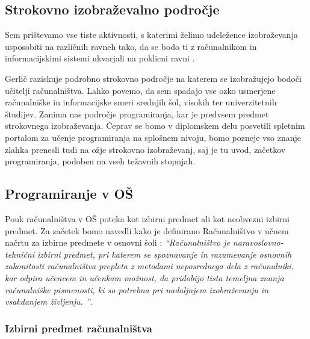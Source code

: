 
\subsection{Strokovno izobraževalno področje}
\label{sec:strokovno_izo_področje}


Sem prištevamo vse tiste aktivnosti, s katerimi želimo udeležence
izobraževanja usposobiti na različnih ravneh tako, da se bodo ti z
računalnikom in informacijskimi sistemi ukvarjali na poklicni ravni
\cite{gerlic_2000}.

Gerlič raziskuje podrobno strokovno področje na katerem se
izobražujejo bodoči učitelji računalništva. Lahko povemo, da sem
spadajo vse ozko usmerjene računalniške in informacijske smeri srednjih
šol, visokih ter univerzitetnih študijev. Zanima nas področje
programiranja, kar je predvsem predmet strokovnega
izobraževanja. Čeprav se bomo v diplomskem delu posvetili spletnim
portalom za učenje programiranja na splošnem nivoju, bomo pozneje vso
znanje zlahka prenesli tudi na ožje strokovno izobraževanj, saj je tu
uvod, začetkov programiranja, podoben na vseh težavnih stopnjah.

\subsection{Programiranje v OŠ}
\label{sec:Programiranje_v_OŠ}

Pouk računalništva v OŠ poteka kot izbirni predmet ali kot neobvezni
izbirni predmet. Za začetek bomo navedli kako je definirano
Računalništvo v učnem načrtu za izbirne predmete v osnovni šoli
\cite{ucni_nacrt-izbirni-os}:
\emph{``Računalništvo je
  naravoslovno-tehnični izbirni predmet, pri katerem se spoznavanje in
  razumevanje osnovnih zakonitosti računalništva prepleta z metodami
  neposrednega dela z računalniki, kar odpira učencem in učenkam
  možnost, da pridobijo tista temeljna znanja računalniške pismenosti,
  ki so potrebna pri nadaljnjem izobraževanju in vsakdanjem življenju.
  ''}.

\subsubsection{Izbirni predmet računalništva}
\label{sec:izbirni_predmet_rac}

